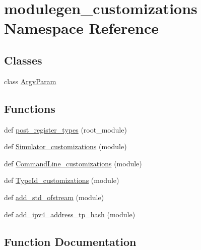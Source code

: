 \hypertarget{namespacemodulegen__customizations}{}\section{modulegen\+\_\+customizations Namespace Reference}
\label{namespacemodulegen__customizations}
\subsection*{Classes}
\begin{DoxyCompactItemize}
\item 
class \hyperlink{classmodulegen__customizations_1_1ArgvParam}{Argv\+Param}
\end{DoxyCompactItemize}
\subsection*{Functions}
\begin{DoxyCompactItemize}
\item 
def \hyperlink{namespacemodulegen__customizations_a752cb066e8de8ee88028481335101ec9}{post\+\_\+register\+\_\+types} (root\+\_\+module)
\item 
def \hyperlink{namespacemodulegen__customizations_afb127c0333e2c1a8f1df9e5d0970ceea}{Simulator\+\_\+customizations} (module)
\item 
def \hyperlink{namespacemodulegen__customizations_ae3405a5c68e65ca0b437e669324f1137}{Command\+Line\+\_\+customizations} (module)
\item 
def \hyperlink{namespacemodulegen__customizations_a4f5089ad18d21ef000444e780f2ecd40}{Type\+Id\+\_\+customizations} (module)
\item 
def \hyperlink{namespacemodulegen__customizations_a34c99faa371f389a7584911a7248e2f7}{add\+\_\+std\+\_\+ofstream} (module)
\item 
def \hyperlink{namespacemodulegen__customizations_a53789676c4b3f9b31690de930793b3bf}{add\+\_\+ipv4\+\_\+address\+\_\+tp\+\_\+hash} (module)
\end{DoxyCompactItemize}


\subsection{Function Documentation}
